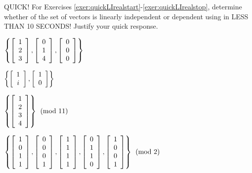 \noindent QUICK! For Exercises \ref{exer:quickLIrealstart}-\ref{exer:quickLIrealstop}, determine whether of the set of vectors is linearly independent or dependent using  in LESS THAN 10 SECONDS! Justify your quick response. 
\begin{enumerate}[!HW!, label=$\spadesuit$ \arabic*., ref=\arabic*]
\begin{multicols}{2}
\item\label{exer:quickLIrealstart} $\left\{\vr{1\\2\\3}, \vr{0\\1\\4}, \vr{0\\0\\0}\right\}$
\item $\left\{\mtx{c}{1\\i}, \vr{1\\0}\right\}$
\end{multicols}
\begin{multicols}{2}
\item $\left\{\vr{1\\2\\3\\4}\right\} \pmod{11}$
\item\label{exer:quickLIrealstop} \mbox{$\left\{\vr{1\\0\\1\\1}, \vr{0\\0\\0\\1}, \vr{1\\1\\1\\1}, \vr{0\\1\\1\\0}, \vr{1\\0\\0\\1}\right\} \pmod 2$}
\end{multicols}
\end{enumerate}

